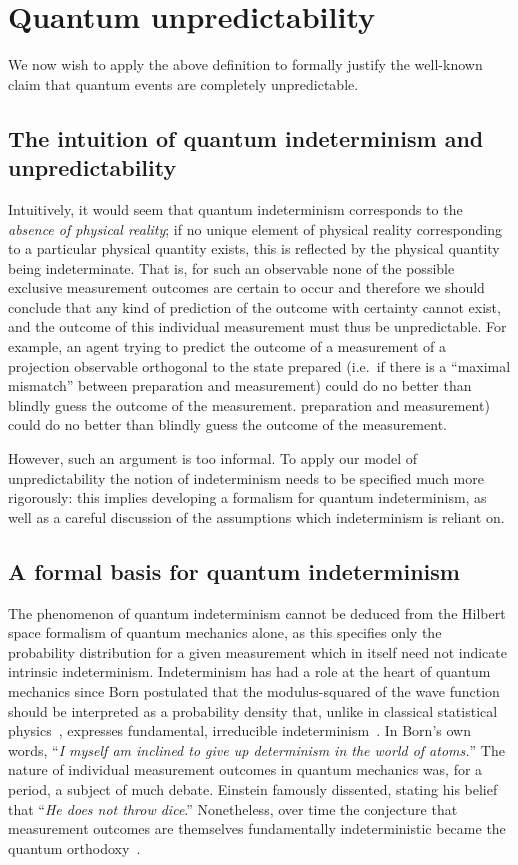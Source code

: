 \documentclass[%
 superscriptaddress,
 preprint,
 showpacs,
 showkeys,
 preprintnumbers,
  amsmath,amssymb,
  aps,
 pra,
  longbibliography,
  floatfix,
 ]{revtex4-1}
\theoremstyle{definition}
\begin{document}
\section{Quantum unpredictability}

We now wish to  apply the above definition to formally justify  the well-known claim that quantum events are completely unpredictable.


\subsection{The intuition of quantum indeterminism and unpredictability}

Intuitively, it would seem that quantum indeterminism corresponds to the {\em absence of physical reality};
if no unique element of physical reality corresponding to a particular physical quantity exists, this is reflected by the physical quantity being indeterminate.
That is, for such an observable none of the possible exclusive measurement outcomes are certain to occur and therefore we should conclude that any kind of prediction of the outcome with certainty cannot exist, and the outcome of this individual measurement must thus be unpredictable.  For example, an agent trying to predict the outcome of a measurement of a projection observable orthogonal to the state prepared (i.e.\  if there is a ``maximal mismatch'' between preparation and measurement) could do no better than blindly guess the outcome of the measurement.
preparation and measurement) could do no better than blindly guess the outcome of the measurement.

However, such an argument is  too informal.  To apply our model of unpredictability 
the notion of indeterminism needs to be specified much more rigorously: this implies developing a formalism for quantum indeterminism, as well as a careful discussion of the assumptions which indeterminism is reliant on.


\subsection{A formal basis for quantum indeterminism}
\label{sec:FQI}

The phenomenon of quantum indeterminism cannot be deduced from the Hilbert space formalism of quantum mechanics alone, as this specifies only the probability distribution for a given measurement which in itself need not indicate intrinsic indeterminism.
Indeterminism has had a role at the heart of quantum mechanics since Born postulated that the modulus-squared of the wave function should be interpreted as a probability density that, unlike in classical statistical physics~\cite{Myrvold2011237}, expresses fundamental,  irreducible indeterminism~\cite{born-26-1}.
In Born's own words, ``{\em I myself am inclined  to give up determinism in the world of atoms.}''
The nature of individual measurement outcomes in quantum mechanics was, for a period, a subject of much debate.
Einstein famously dissented, stating his belief that \cite[p. 204]{born-69} ``\emph{He does not throw dice}.''
Nonetheless, over time the conjecture that measurement outcomes are themselves fundamentally indeterministic became the quantum orthodoxy~\cite{zeil-05_nature_ofQuantum}.
\end{document}
